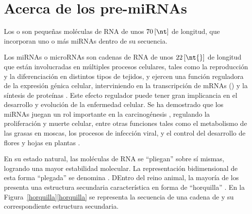 %
%
%
\section{Acerca de los pre-miRNAs}
%
Los  o  son pequeñas moléculas
de RNA de unos $70\,[\nt]$ de longitud, que incorporan uno o más
miRNAs dentro de su secuencia.

Los miRNAs o microRNAs son cadenas de RNA de unos $22\,[\nt{}]$ de
longitud que están involucradas en múltiples procesos celulares, tales
como la reproducción y la diferenciación en distintos tipos de
tejidos, y ejercen una función reguladora de la expresión génica
celular, interviniendo en la transcripción de mRNAs () y la síntesis de proteínas \cite{lee-mammal}
\cite{bartel116} \cite{lili}.
Este efecto regulador puede tener gran implicancia en el desarrollo y
evolución de la enfermedad celular.
Se ha demostrado que los miRNAs juegan un rol importante en la
carcinogénesis \cite{aurora,lili}, regulando la proliferación y muerte
celular, entre otras funciones tales como el metabolismo de las grasas
en moscas, los procesos de infección viral, y el control del
desarrollo de flores y hojas en plantas \cite{bartel116,lecellier}.

En su estado natural, las moléculas de RNA se ``pliegan'' sobre sí
mismas, logrando una mayor estabilidad molecular.
La representación bidimensional de esta forma ``plegada'' se denomina
.
DEntro del reino animal, la mayoría de los  presenta una
estructura secundaria característica en forma de ``horquilla''
\cite{bartel116,sewer}.
En la \iflatexml{}Figura~\ref{horquilla}\else\autoref{horquilla}\fi{}
se representa la secuencia de una cadena de \premirna{} y
su correspondiente estructura secundaria.
